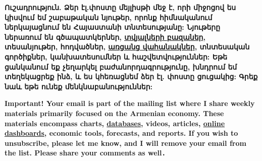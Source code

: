 \documentclass[
]{article}
\begin{document}
\textbf{Ուշադրություն. Ձեր էլ.փոստը մեյլիսթի մեջ է, որի միջոցով ես
կիսվում եմ շաբաթական նյութեր, որոնք հիմնականում ներկայացնում են
Հայաստանի տնտեսությանը: Նյութերը ներառում են գծապատկերներ,
\href{https://github.com/tavad/tvyal_newsletter}{տվյալների բազաներ},
տեսանյութեր, հոդվածներ, \href{https://www.tvyal.com/projects}{առցանց
վահանակներ}, տնտեսական գործիքներ, կանխատեսումներ և հաշվետվություններ:
Եթե ցանկանում եք չեղարկել բաժանորդագրությունը, խնդրում եմ տեղեկացրեք
ինձ, և ես կհեռացնեմ ձեր էլ. փոստը ցուցակից: Գրեք նաև եթե ունեք
մենկնաբանություններ:}

\textbf{Important! Your email is part of the mailing list where I share
weekly materials primarily focused on the Armenian economy. These
materials encompass charts,
\href{https://github.com/tavad/tvyal_newsletter}{databases}, videos,
articles, \href{https://www.tvyal.com/projects}{online dashboards},
economic tools, forecasts, and reports. If you wish to unsubscribe,
please let me know, and I will remove your email from the list. Please
share your comments as well․}
\end{document}
